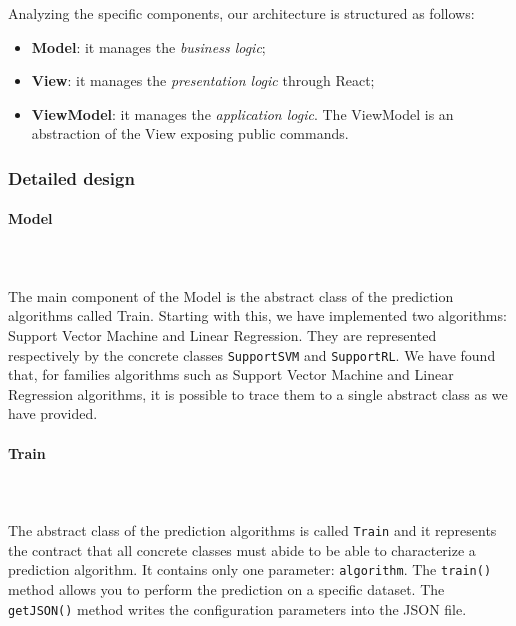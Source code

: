 Analyzing the specific components, our architecture is structured as follows:
\begin{itemize}
\item \textbf{Model}: it manages the \textit{business logic};
\item \textbf{View}: it manages the \textit{presentation logic} through React;
\item \textbf{ViewModel}: it manages the \textit{application logic}\glo. The ViewModel is an abstraction of the View exposing public commands.
\end{itemize}

\subsubsection{Detailed design}

\paragraph{Model}\mbox{} \\ \mbox{} \\
The main component of the Model is the abstract class of the prediction algorithms called Train. Starting with this, we have implemented
two algorithms: Support Vector Machine and Linear Regression.
They are represented respectively by the concrete classes \texttt{SupportSVM}
and \texttt{SupportRL}. We have found that, for families algorithms such as Support Vector Machine and Linear Regression algorithms, it is possible to trace them to a single abstract class as we have provided. 

\paragraph*{Train}\mbox{} \\ \mbox{} \\
The abstract class of the prediction algorithms is called \texttt{Train} and it
represents the contract that all concrete classes must abide to be able to characterize a prediction algorithm. It contains only one parameter: \texttt{algorithm}. The \texttt{train()} method allows you to perform the prediction on a specific dataset. The \texttt{getJSON()} method writes the configuration parameters into the JSON file.

